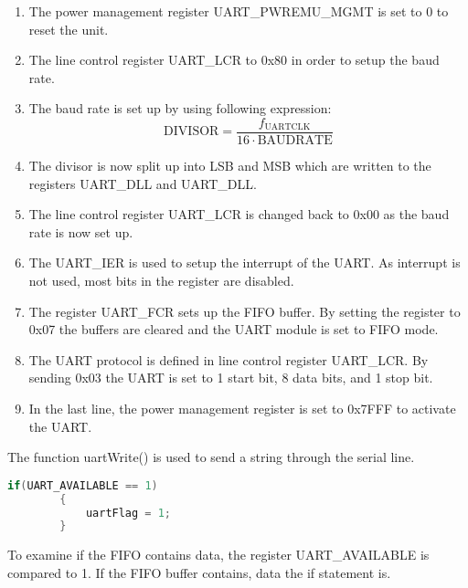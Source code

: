\begin{enumerate}
\item The power management register UART\_PWREMU\_MGMT is set to 0 to reset the unit.
\item The line control register UART\_LCR to 0x80 in order to setup the baud rate. 
\item The baud rate is set up by using following expression:
\begin{equation}
\text{DIVISOR} = \frac{f_{\text{UARTCLK}}}{16\cdot \text{BAUDRATE}}
\end{equation} 
\item The divisor is now split up into LSB and MSB which are written to the registers UART\_DLL and UART\_DLL.
\item The line control register UART\_LCR is changed back to 0x00 as the baud rate is now set up.
\item The UART\_IER is used to setup the interrupt of the UART. As interrupt is not used, most bits in the register are disabled.
\item The register UART\_FCR sets up the FIFO buffer. By setting the register to 0x07 the buffers are cleared and the UART module is set to FIFO mode.
\item The UART protocol is defined in line control register UART\_LCR. By sending 0x03 the UART is set to 1 start bit, 8 data bits, and 1 stop bit.
\item In the last line, the power management register is set to 0x7FFF to activate the UART.
\end{enumerate}

The function uartWrite() is used to send a string through the serial line.

\begin{lstlisting}[language=C, caption = {Set a flag high if data available in FIFO},label={listingUartFlag}]
    	if(UART_AVAILABLE == 1)
    	{	
			uartFlag = 1;
		}
\end{lstlisting}

To examine if the FIFO contains data, the register UART\_AVAILABLE is compared to 1. If the FIFO buffer contains, data the if statement is.


